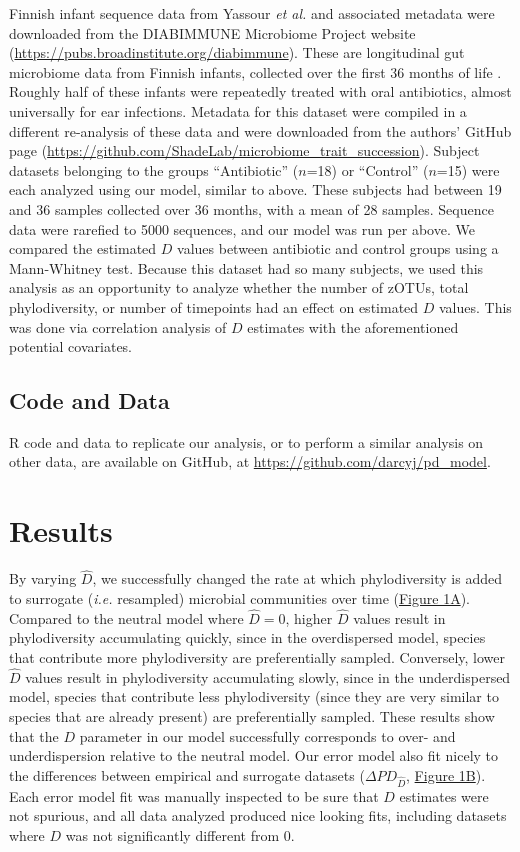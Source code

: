 \documentclass{article}
\begin{document}
\par
Finnish infant sequence data from Yassour \emph{et al.} \cite{Yassour2016} and associated metadata were downloaded from the DIABIMMUNE Microbiome Project website (\url{https://pubs.broadinstitute.org/diabimmune}). These are longitudinal gut microbiome data from Finnish infants, collected over the first 36 months of life \cite{Yassour2016}. Roughly half of these infants were repeatedly treated with oral antibiotics, almost universally for ear infections. Metadata for this dataset were compiled in a different re-analysis of these data \cite{Guittar2019} and were downloaded from the authors’ GitHub page (\url{https://github.com/ShadeLab/microbiome_trait_succession}). Subject datasets belonging to the groups “Antibiotic” (\(n\)=18) or “Control” (\(n\)=15) were each analyzed using our model, similar to above. These subjects had between 19 and 36 samples collected over 36 months, with a mean of 28 samples. Sequence data were rarefied to 5000 sequences, and our model was run per above. We compared the estimated \(D\) values between antibiotic and control groups using a Mann-Whitney test. Because this dataset had so many subjects, we used this analysis as an opportunity to analyze whether the number of zOTUs, total phylodiversity, or number of timepoints had an effect on estimated \(D\) values. This was done via correlation analysis of \(D\) estimates with the aforementioned potential covariates.

\subsection{Code and Data} \label{sec:codeAndData}
R code and data to replicate our analysis, or to perform a similar analysis on other data, are available on GitHub, at \url{https://github.com/darcyj/pd_model}. 


\section{Results} \label{sec:results}
By varying \(\hat{D}\), we successfully changed the rate at which phylodiversity is added to surrogate (\emph{i.e.} resampled) microbial communities over time (\hyperref[sec:figure1]{Figure 1A}). Compared to the neutral model where \(\hat{D} = 0\), higher \(\hat{D}\) values result in phylodiversity accumulating quickly, since in the overdispersed model, species that contribute more phylodiversity are preferentially sampled. Conversely, lower \(\hat{D}\) values result in phylodiversity accumulating slowly, since in the underdispersed model, species that contribute less phylodiversity (since they are very similar to species that are already present) are preferentially sampled. These results show that the \(D\) parameter in our model successfully corresponds to over- and underdispersion relative to the neutral model. Our error model also fit nicely to the differences between empirical and surrogate datasets (\(\Delta PD_{\hat{D}}\), \hyperref[sec:figure1]{Figure 1B}). Each error model fit was manually inspected to be sure that \(D\) estimates were not spurious, and all data analyzed produced nice looking fits, including datasets where \(D\) was not significantly different from 0. 
\end{document}
